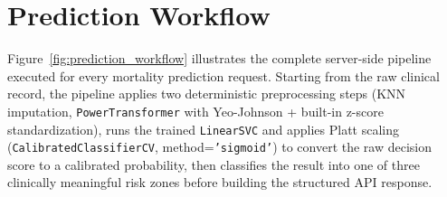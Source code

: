 \documentclass[12pt,a4paper,twoside]{report}
\begin{document}
\section{Prediction Workflow}\label{sec:pred_workflow}

Figure~\ref{fig:prediction_workflow} illustrates the complete server-side pipeline executed for every mortality prediction request. Starting from the raw clinical record, the pipeline applies two deterministic preprocessing steps (KNN imputation, \texttt{PowerTransformer} with Yeo-Johnson + built-in z-score standardization), runs the trained \texttt{LinearSVC} and applies Platt scaling (\texttt{CalibratedClassifierCV}, method=\texttt{'sigmoid'}) to convert the raw decision score to a calibrated probability, then classifies the result into one of three clinically meaningful risk zones before building the structured API response.
\end{document}
